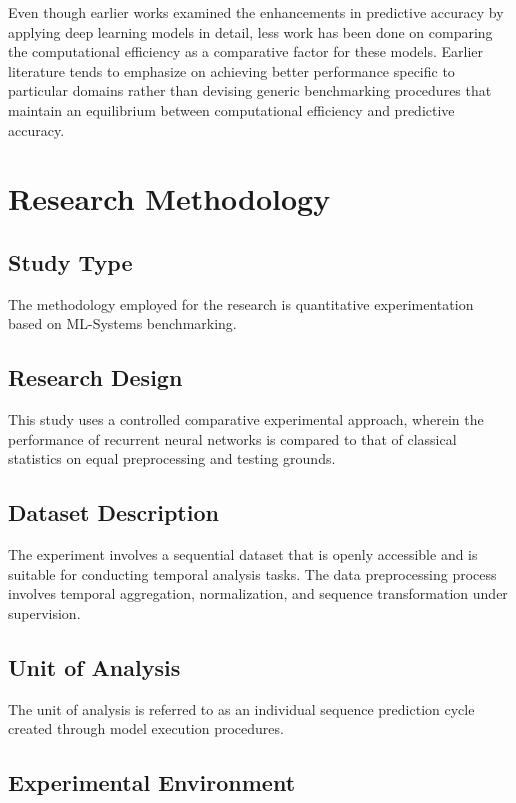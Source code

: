 \documentclass[12pt]{report}
\begin{document}
Even though earlier works examined the enhancements in predictive accuracy by applying deep learning models in detail, less work has been done on comparing the computational efficiency as a comparative factor for these models. Earlier literature tends to emphasize on achieving better performance specific to particular domains rather than devising generic benchmarking procedures that maintain an equilibrium between computational efficiency and predictive accuracy.

\chapter{Research Methodology}

\section{Study Type}

The methodology employed for the research is quantitative experimentation based on ML-Systems benchmarking.


\section{Research Design}

This study uses a controlled comparative experimental approach, wherein the performance of recurrent neural networks is compared to that of classical statistics on equal preprocessing and testing grounds.


\section{Dataset Description}

The experiment involves a sequential dataset that is openly accessible and is suitable for conducting temporal analysis tasks. The data preprocessing process involves temporal aggregation, normalization, and sequence transformation under supervision.


\section{Unit of Analysis}

The unit of analysis is referred to as an individual sequence prediction cycle created through model execution procedures.


\section{Experimental Environment}
\end{document}
